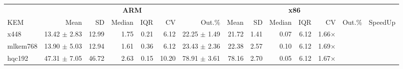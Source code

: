 \begin{table}[!ht]
\centering
\begin{tabular}{l|rrrrrr|rrrrrr|r}
\toprule
& \multicolumn{6}{c}{\bfseries ARM} & \multicolumn{6}{c}{\bfseries x86} & \\
\cmidrule(lr){2-7} \cmidrule(lr){8-13}
		KEM & Mean & SD & Median & IQR & CV & Out.\% & Mean & SD & Median & IQR & CV & Out.\% & SpeedUp \\
\midrule
x448				 & 13.42 $\pm$  2.83 & 12.99 & 1.75 & 0.21 & 6.12    & 22.25 $\pm$  1.49 & 21.72 & 1.41 & 0.07 & 6.12 & 1.66× \\
mlkem768		 & 13.90  $\pm$  5.03 & 12.94 & 1.61 & 0.36 & 6.12    & 23.43 $\pm$  2.36 & 22.38 & 2.57 & 0.10 & 6.12 & 1.69× \\
hqc192 		 & 47.31  $\pm$  7.05 & 46.72 & 2.63 & 0.15 & 10.20 & 78.91 $\pm$  3.61 & 78.16 & 2.70 & 0.05 & 6.12 & 1.67× \\
\bottomrule
\end{tabular}
\end{table}
